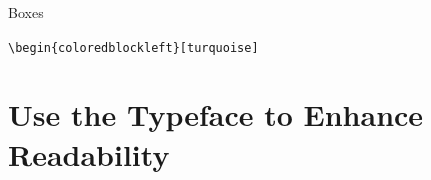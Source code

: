 \documentclass[aspectratio=169]{beamer}
\begin{document}
\begin{frame}{Boxes}
\begin{minipage}[t]{0.49\textwidth}
    \end{minipage}

    \centering
    \begin{minipage}[t]{0.49\textwidth}
        \begin{coloredblockleft}
            \vspace{0.3cm}
            \texttt{\textbackslash begin\{coloredblockleft\}[turquoise]}\strut
        \end{coloredblockleft}
        
    \end{minipage}
\end{frame}


\section{Use the \textbf{Typeface} to Enhance Readability}

\begin{frame}
\end{frame}
\end{document}
